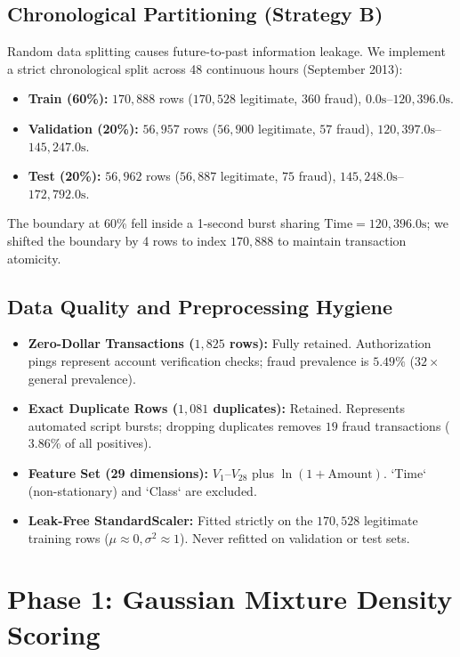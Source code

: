 \documentclass[conference]{IEEEtran}
\begin{document}
\subsection{Chronological Partitioning (Strategy B)}
Random data splitting causes future-to-past information leakage. We implement a strict chronological split across 48 continuous hours (September 2013):
\begin{itemize}
    \item \textbf{Train (60\%):} $170,888$ rows ($170,528$ legitimate, $360$ fraud), $0.0\text{s}$--$120,396.0\text{s}$.
    \item \textbf{Validation (20\%):} $56,957$ rows ($56,900$ legitimate, $57$ fraud), $120,397.0\text{s}$--$145,247.0\text{s}$.
    \item \textbf{Test (20\%):} $56,962$ rows ($56,887$ legitimate, $75$ fraud), $145,248.0\text{s}$--$172,792.0\text{s}$.
\end{itemize}
The boundary at 60\% fell inside a 1-second burst sharing $\text{Time} = 120,396.0\text{s}$; we shifted the boundary by 4 rows to index $170,888$ to maintain transaction atomicity.

\subsection{Data Quality and Preprocessing Hygiene}
\begin{itemize}
    \item \textbf{Zero-Dollar Transactions ($1,825$ rows):} Fully retained. Authorization pings represent account verification checks; fraud prevalence is $5.49\%$ ($32\times$ general prevalence).
    \item \textbf{Exact Duplicate Rows ($1,081$ duplicates):} Retained. Represents automated script bursts; dropping duplicates removes $19$ fraud transactions ($3.86\%$ of all positives).
    \item \textbf{Feature Set (29 dimensions):} $V_1$--$V_{28}$ plus $\ln(1 + \text{Amount})$. `Time` (non-stationary) and `Class` are excluded.
    \item \textbf{Leak-Free StandardScaler:} Fitted strictly on the $170,528$ legitimate training rows ($\mu \approx 0, \sigma^2 \approx 1$). Never refitted on validation or test sets.
\end{itemize}

\section{Phase 1: Gaussian Mixture Density Scoring}
\end{document}
